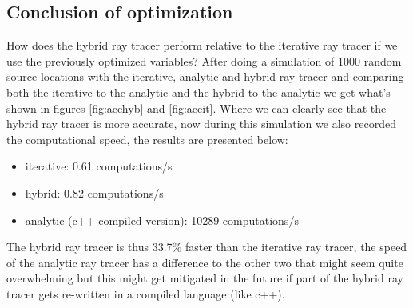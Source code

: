 \documentclass[11pt,a4paper,faculty=we,language=en,doctype=report]{cls/ugent-doc}
\begin{document}
\subsection{Conclusion of optimization}
How does the hybrid ray tracer perform relative to the iterative ray tracer if we use 
the previously optimized variables? After doing a simulation of 1000 random source locations with
the iterative, analytic and hybrid ray tracer and comparing both the iterative to the analytic and the hybrid to the analytic
we get what's shown in figures \ref{fig:acchyb} and \ref{fig:accit}. Where we can clearly see that the hybrid
ray tracer is more accurate, now during this simulation we also recorded the computational speed, the results
are presented below:
\begin{itemize}
	\item iterative: 0.61 computations/s
	\item hybrid: 0.82 computations/s
	\item analytic (c++ compiled version): 10289 computations/s
\end{itemize}
The hybrid ray tracer is thus 33.7\% faster than the iterative ray tracer, the speed of the analytic ray tracer
has a difference to the other two that might seem quite overwhelming but this might get mitigated in the future if 
part of the hybrid ray tracer gets re-written in a compiled language (like c++).
\end{document}
